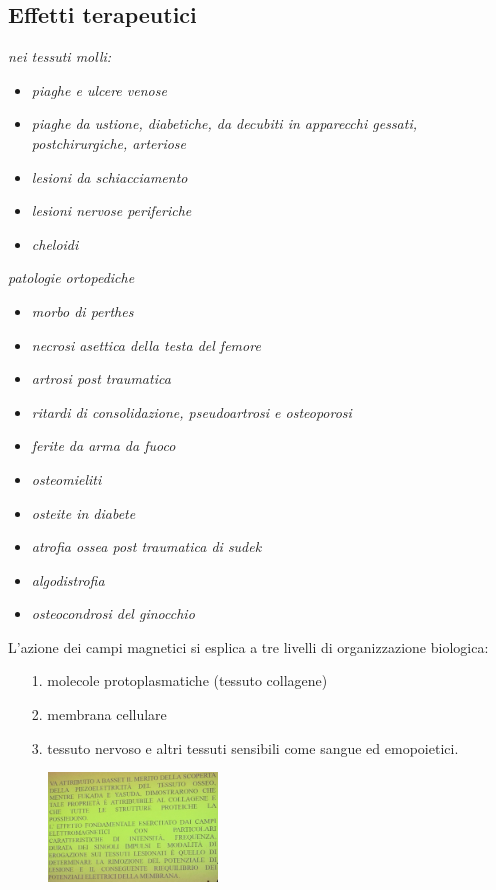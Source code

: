 \subsection{Effetti terapeutici}

\emph{\emph{nei tessuti molli:}}

\begin{itemize}
\item
  \emph{piaghe e ulcere venose}
\item
  \emph{piaghe da ustione, diabetiche, da decubiti in apparecchi
  gessati, postchirurgiche, arteriose}
\item
  \emph{lesioni da schiacciamento}
\item
  \emph{lesioni nervose periferiche}
\item
  \emph{cheloidi}
\end{itemize}

\emph{\emph{patologie ortopediche}}

\begin{itemize}
\item
  \emph{morbo di perthes}
\item
  \emph{necrosi asettica della testa del femore}
\item
  \emph{artrosi post traumatica}
\item
  \emph{ritardi di consolidazione, pseudoartrosi e osteoporosi}
\item
  \emph{ferite da arma da fuoco}
\item
  \emph{osteomieliti}
\item
  \emph{osteite in diabete}
\item
  \emph{atrofia ossea post traumatica di sudek}
\item
  \emph{algodistrofia}
\item
  \emph{osteocondrosi del ginocchio}
\end{itemize}

L'azione dei campi magnetici si esplica a tre livelli di organizzazione
biologica:

\begin{itemize}
\item[1.]
  molecole protoplasmatiche (tessuto collagene)
\item[2.]
  membrana cellulare
\item[3.]
  tessuto nervoso e altri tessuti sensibili come sangue ed emopoietici.
\end{itemize}

\begin{figure}[!ht]
\centering
\includegraphics[width=0.4\textwidth]{026/image1.png}
\end{figure}

